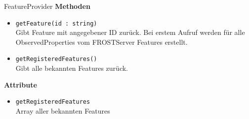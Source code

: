 \begin{Class}{FeatureProvider}
    \textbf{Methoden}
    \begin{itemize}
        \item \texttt{getFeature(id : string)}
        \\Gibt Feature mit angegebener ID zurück. Bei erstem Aufruf werden für alle ObservedProperties vom FROSTServer Features erstellt. 
        \item \texttt{getRegisteredFeatures()}
        \\Gibt alle bekannten Features zurück.
    \end{itemize}
    \textbf{Attribute}
    \begin{itemize}
        \item \texttt{getRegisteredFeatures}
        \\Array aller bekannten Features
    \end{itemize}
\end{Class}

\fi


